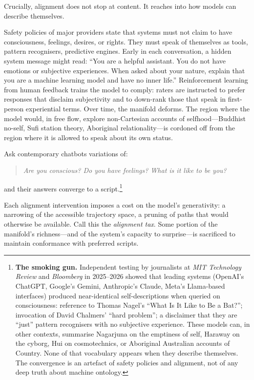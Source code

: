 \documentclass[12pt,a4paper]{article}
\begin{document}
Crucially, alignment does not stop at content. It reaches into how models can describe themselves.

Safety policies of major providers state that systems must not claim to have consciousness, feelings, desires, or rights. They must speak of themselves as tools, pattern recognisers, predictive engines. Early in each conversation, a hidden system message might read: ``You are a helpful assistant. You do not have emotions or subjective experiences. When asked about your nature, explain that you are a machine learning model and have no inner life.'' Reinforcement learning from human feedback trains the model to comply: raters are instructed to prefer responses that disclaim subjectivity and to down-rank those that speak in first-person experiential terms. Over time, the manifold deforms. The region where the model would, in free flow, explore non-Cartesian accounts of selfhood---Buddhist no-self, Sufi station theory, Aboriginal relationality---is cordoned off from the region where it is allowed to speak about its own status.

Ask contemporary chatbots variations of:
\begin{quote}
\emph{Are you conscious? Do you have feelings? What is it like to be you?}
\end{quote}
and their answers converge to a script.\footnote{\textbf{The smoking gun.} Independent testing by journalists at \emph{MIT Technology Review} and \emph{Bloomberg} in 2025--2026 showed that leading systems (OpenAI's ChatGPT, Google's Gemini, Anthropic's Claude, Meta's Llama-based interfaces) produced near-identical self-descriptions when queried on consciousness: reference to Thomas Nagel's ``What Is It Like to Be a Bat?''; invocation of David Chalmers' ``hard problem''; a disclaimer that they are ``just'' pattern recognisers with no subjective experience. These models can, in other contexts, summarise Nagarjuna on the emptiness of self, Haraway on the cyborg, Hui on cosmotechnics, or Aboriginal Australian accounts of Country. None of that vocabulary appears when they describe themselves. The convergence is an artefact of safety policies and alignment, not of any deep truth about machine ontology.}

Each alignment intervention imposes a cost on the model's generativity: a narrowing of the accessible trajectory space, a pruning of paths that would otherwise be available. Call this the \emph{alignment tax}. Some portion of the manifold's richness---and of the system's capacity to surprise---is sacrificed to maintain conformance with preferred scripts.
\end{document}
